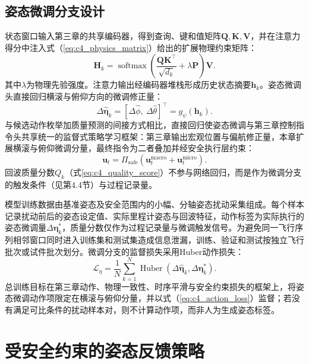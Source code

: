 \subsection{姿态微调分支设计}

状态窗口输入第三章的共享编码器，得到查询、键和值矩阵$\mathbf{Q},\mathbf{K},\mathbf{V}$，并在注意力得分中注入式（\ref{eq:c4_physics_matrix}）给出的扩展物理约束矩阵：
\begin{equation}
\mathbf{H}_k =
\operatorname{softmax}\left(
\frac{\mathbf{Q}\mathbf{K}^{\top}}{\sqrt{d_k}}
+\lambda\mathbf{P}
\right)\mathbf{V}.
\label{eq:c4_physics_attention}
\end{equation}
其中$\lambda$为物理先验强度。注意力输出经编码器堆栈形成历史状态摘要$\mathbf{h}_k$。姿态微调头直接回归横滚与俯仰方向的微调修正量：
\begin{equation}
\Delta\hat{\boldsymbol{\eta}}_k
=
\left[\Delta\hat\phi,\ \Delta\hat\theta\right]^{\top}
=
g_{\psi}\left(\mathbf{h}_k\right).
\label{eq:c4_micro_head}
\end{equation}
与候选动作枚举加质量预测的间接方式相比，直接回归使姿态微调与第三章控制指令头共享统一的监督式策略学习框架：第三章输出宏观位置与偏航修正量，本章扩展横滚与俯仰微调分量，最终指令为二者叠加并经安全执行层约束：
\begin{equation}
\mathbf{u}_t =
\Pi_{\mathrm{safe}}\left(
\mathbf{u}^{\mathrm{macro}}_t+
\mathbf{u}^{\mathrm{micro}}_t
\right).
\label{eq:c4_macro_micro}
\end{equation}
回波质量分数$Q_k$（式\ref{eq:c4_quality_score}）不参与网络回归，而是作为微调分支的触发条件（见第4.4节）与过程记录量。

模型训练数据由基准姿态及安全范围内的小幅、分轴姿态扰动采集组成。每个样本记录扰动前后的姿态设定值、实际里程计姿态与回波特征，动作标签为实际执行的姿态微调量$\Delta\boldsymbol{\eta}^{*}_k$，质量分数仅作为过程记录量与微调触发信号。为避免同一飞行序列相邻窗口同时进入训练集和测试集造成信息泄漏，训练、验证和测试按独立飞行批次或试件批次划分。微调分支的监督损失采用Huber动作损失：
\begin{equation}
\mathcal{L}_{\eta} =
\frac{1}{N}\sum_{k=1}^{N}
\operatorname{Huber}\left(
\Delta\hat{\boldsymbol{\eta}}_{k},
\Delta\boldsymbol{\eta}^{*}_{k}
\right).
\label{eq:c4_action_loss}
\end{equation}
总训练目标在第三章动作、物理一致性、时序平滑与安全约束损失的框架上，将姿态微调动作项限定在横滚与俯仰分量，并以式（\ref{eq:c4_action_loss}）监督；若没有满足可比条件的扰动样本对，则不计算动作项，而非人为生成姿态标签。

\section{受安全约束的姿态反馈策略}

